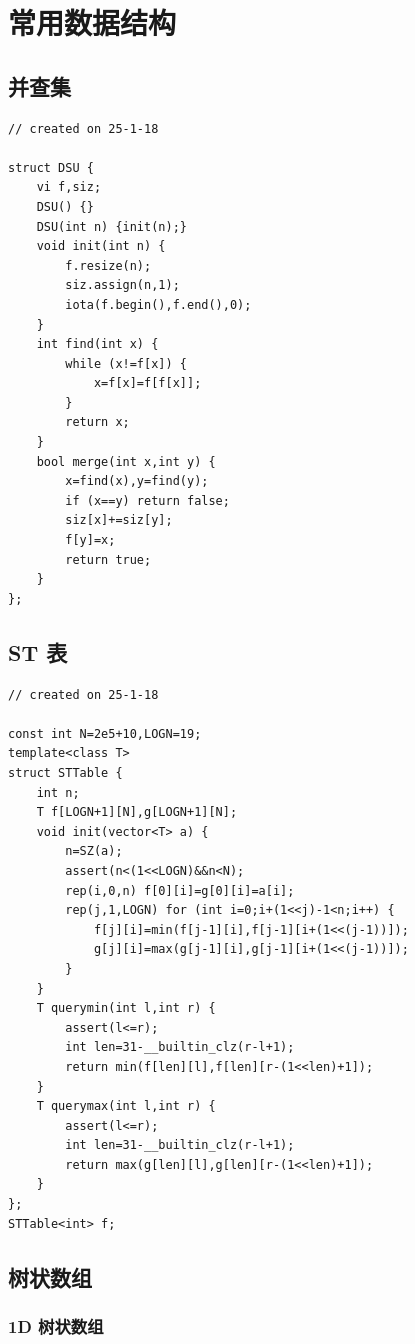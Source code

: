 \documentclass[a4paper,12pt]{article}
\begin{document}
\section{常用数据结构}

\subsection{并查集}

\begin{lstlisting}
// created on 25-1-18

struct DSU {
	vi f,siz;
	DSU() {}
	DSU(int n) {init(n);}
	void init(int n) {
		f.resize(n);
		siz.assign(n,1);
		iota(f.begin(),f.end(),0);
	}
	int find(int x) {
		while (x!=f[x]) {
			x=f[x]=f[f[x]];
		}
		return x;
	}
	bool merge(int x,int y) {
		x=find(x),y=find(y);
		if (x==y) return false;
		siz[x]+=siz[y];
		f[y]=x;
		return true;
	}
};
\end{lstlisting}

\subsection{ST 表}

\begin{lstlisting}
// created on 25-1-18

const int N=2e5+10,LOGN=19;
template<class T>
struct STTable {
    int n;
    T f[LOGN+1][N],g[LOGN+1][N];
    void init(vector<T> a) {
        n=SZ(a);
        assert(n<(1<<LOGN)&&n<N);
        rep(i,0,n) f[0][i]=g[0][i]=a[i];
        rep(j,1,LOGN) for (int i=0;i+(1<<j)-1<n;i++) {
            f[j][i]=min(f[j-1][i],f[j-1][i+(1<<(j-1))]);
            g[j][i]=max(g[j-1][i],g[j-1][i+(1<<(j-1))]);
        }
    }
    T querymin(int l,int r) {
        assert(l<=r);
        int len=31-__builtin_clz(r-l+1);
        return min(f[len][l],f[len][r-(1<<len)+1]);
    }
    T querymax(int l,int r) {
        assert(l<=r);
        int len=31-__builtin_clz(r-l+1);
        return max(g[len][l],g[len][r-(1<<len)+1]);
    }
};
STTable<int> f;
\end{lstlisting}

\subsection{树状数组}

\subsubsection{1D 树状数组}
\end{document}
